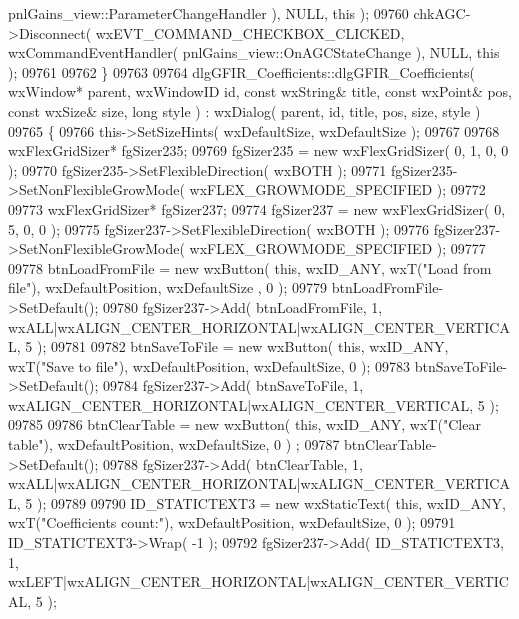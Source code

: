 \begin{DoxyCode}
      pnlGains_view::ParameterChangeHandler ), NULL, \textcolor{keyword}{this} );
09760     chkAGC->Disconnect( wxEVT\_COMMAND\_CHECKBOX\_CLICKED, wxCommandEventHandler( 
      pnlGains_view::OnAGCStateChange ), NULL, \textcolor{keyword}{this} );
09761     
09762 \}
09763 
09764 dlgGFIR_Coefficients::dlgGFIR_Coefficients( wxWindow* parent, wxWindowID \textcolor{keywordtype}{id}, \textcolor{keyword}{const} wxString& title, \textcolor{keyword}{const} 
      wxPoint& pos, \textcolor{keyword}{const} wxSize& size, \textcolor{keywordtype}{long} style ) : wxDialog( parent, id, title, pos, size, style )
09765 \{
09766     this->SetSizeHints( wxDefaultSize, wxDefaultSize );
09767     
09768     wxFlexGridSizer* fgSizer235;
09769     fgSizer235 = \textcolor{keyword}{new} wxFlexGridSizer( 0, 1, 0, 0 );
09770     fgSizer235->SetFlexibleDirection( wxBOTH );
09771     fgSizer235->SetNonFlexibleGrowMode( wxFLEX\_GROWMODE\_SPECIFIED );
09772     
09773     wxFlexGridSizer* fgSizer237;
09774     fgSizer237 = \textcolor{keyword}{new} wxFlexGridSizer( 0, 5, 0, 0 );
09775     fgSizer237->SetFlexibleDirection( wxBOTH );
09776     fgSizer237->SetNonFlexibleGrowMode( wxFLEX\_GROWMODE\_SPECIFIED );
09777     
09778     btnLoadFromFile = \textcolor{keyword}{new} wxButton( \textcolor{keyword}{this}, wxID\_ANY, wxT(\textcolor{stringliteral}{"Load from file"}), wxDefaultPosition, wxDefaultSize
      , 0 );
09779     btnLoadFromFile->SetDefault(); 
09780     fgSizer237->Add( btnLoadFromFile, 1, wxALL|wxALIGN\_CENTER\_HORIZONTAL|wxALIGN\_CENTER\_VERTICAL, 5 );
09781     
09782     btnSaveToFile = \textcolor{keyword}{new} wxButton( \textcolor{keyword}{this}, wxID\_ANY, wxT(\textcolor{stringliteral}{"Save to file"}), wxDefaultPosition, wxDefaultSize, 0 
      );
09783     btnSaveToFile->SetDefault(); 
09784     fgSizer237->Add( btnSaveToFile, 1, wxALIGN\_CENTER\_HORIZONTAL|wxALIGN\_CENTER\_VERTICAL, 5 );
09785     
09786     btnClearTable = \textcolor{keyword}{new} wxButton( \textcolor{keyword}{this}, wxID\_ANY, wxT(\textcolor{stringliteral}{"Clear table"}), wxDefaultPosition, wxDefaultSize, 0 )
      ;
09787     btnClearTable->SetDefault(); 
09788     fgSizer237->Add( btnClearTable, 1, wxALL|wxALIGN\_CENTER\_HORIZONTAL|wxALIGN\_CENTER\_VERTICAL, 5 );
09789     
09790     ID_STATICTEXT3 = \textcolor{keyword}{new} wxStaticText( \textcolor{keyword}{this}, wxID\_ANY, wxT(\textcolor{stringliteral}{"Coefficients count:"}), wxDefaultPosition, 
      wxDefaultSize, 0 );
09791     ID_STATICTEXT3->Wrap( -1 );
09792     fgSizer237->Add( ID_STATICTEXT3, 1, wxLEFT|wxALIGN\_CENTER\_HORIZONTAL|wxALIGN\_CENTER\_VERTICAL, 5 );

\end{DoxyCode}
